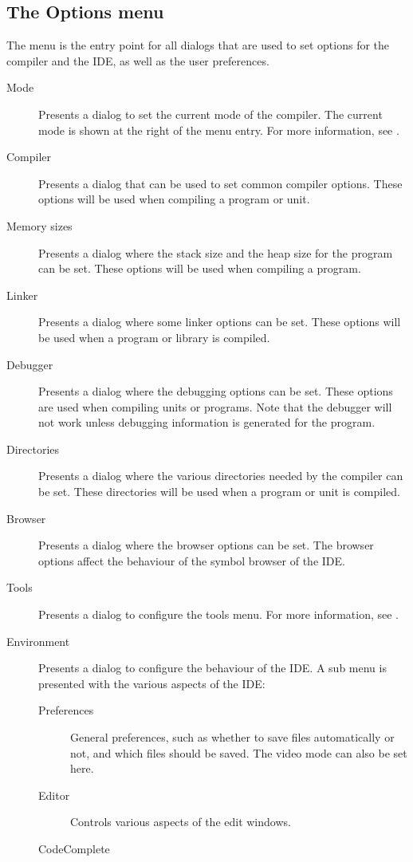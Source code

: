 \subsection{The Options menu}
\label{se:menuoptions}
The  menu is the entry point for all dialogs that are used to set
options for the compiler and the IDE, as well as the user preferences.
\begin{description}
\item[Mode] Presents a dialog to set the current mode of the compiler. The
current mode is shown at the right of the menu entry. For more information,
see .
\item[Compiler] Presents a dialog that can be used to set common compiler
options. These options will be used when compiling a program or unit.
\item[Memory sizes]
Presents a dialog where the stack size and the heap size for the program can
be set. These options will be used when compiling a program.
\item[Linker]
Presents a dialog where some linker options can be set. These options will
be used when a program or library is compiled.
\item[Debugger]
Presents a dialog where the debugging options can be set. These options
are used when compiling units or programs. Note that the debugger will not
work unless debugging information is generated for the program.
\item[Directories]
Presents a dialog where the various directories needed by the compiler can
be set. These directories will be used when a program or unit is compiled.
\item[Browser]
Presents a dialog where the browser options can be set. The browser options
affect the behaviour of the symbol browser of the IDE.
\item[Tools]
Presents a dialog to configure the tools menu. For more information, see
.
\item[Environment]
Presents a dialog to configure the behaviour of the IDE. A sub menu is
presented with the various aspects of the IDE:
\begin{description}
\item[Preferences]
General preferences, such as whether to save files automatically or not, 
and which files should be saved. The video mode can also be set here.
\item[Editor]
Controls various aspects of the edit windows.
\item[CodeComplete]

\end{description}
\end{description}

